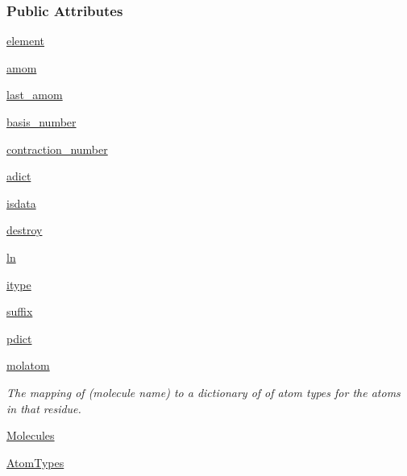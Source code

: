 \subsubsection*{Public Attributes}
\begin{DoxyCompactItemize}
\item 
\hyperlink{classforcebalance_1_1psi4io_1_1GBS__Reader_afa3e259eab3e92b51c2b064f882dd776}{element}
\item 
\hyperlink{classforcebalance_1_1psi4io_1_1GBS__Reader_a322f36949ce67389f107cac80e8f5b40}{amom}
\item 
\hyperlink{classforcebalance_1_1psi4io_1_1GBS__Reader_ae498cfab81dfd12bd0e86037be80135d}{last\-\_\-amom}
\item 
\hyperlink{classforcebalance_1_1psi4io_1_1GBS__Reader_acef6f87327455c97f05e603f9330a0d3}{basis\-\_\-number}
\item 
\hyperlink{classforcebalance_1_1psi4io_1_1GBS__Reader_a77ab2b3c48ee692e3678131c96de9708}{contraction\-\_\-number}
\item 
\hyperlink{classforcebalance_1_1psi4io_1_1GBS__Reader_ac42c3b29532e11a0d8d78b48347739ff}{adict}
\item 
\hyperlink{classforcebalance_1_1psi4io_1_1GBS__Reader_a725975a6e197a132d3c4dba96412f9bb}{isdata}
\item 
\hyperlink{classforcebalance_1_1psi4io_1_1GBS__Reader_a674b528af51d25b0c96da13946d4ea08}{destroy}
\item 
\hyperlink{classforcebalance_1_1basereader_1_1BaseReader_ab04436f3968d9bd6ec09238ee6537ec6}{ln}
\item 
\hyperlink{classforcebalance_1_1basereader_1_1BaseReader_a0c5b4d7b1c87dbcc9a8a0fdc82eee023}{itype}
\item 
\hyperlink{classforcebalance_1_1basereader_1_1BaseReader_ab2aba0f349b78cb3c1e11c35f56d6bdf}{suffix}
\item 
\hyperlink{classforcebalance_1_1basereader_1_1BaseReader_a1ca75e7775c49f57796fb3ba816486e7}{pdict}
\item 
\hyperlink{classforcebalance_1_1basereader_1_1BaseReader_a56e6e6024825ada94ab24f5f3ce59851}{molatom}
\begin{DoxyCompactList}\small\item\em The mapping of (molecule name) to a dictionary of of atom types for the atoms in that residue. \end{DoxyCompactList}\item 
\hyperlink{classforcebalance_1_1basereader_1_1BaseReader_ad2842550aa690f1cd82e41ec8d6fe541}{Molecules}
\item 
\hyperlink{classforcebalance_1_1basereader_1_1BaseReader_ad5765e192499937376950410364014af}{Atom\-Types}
\end{DoxyCompactItemize}


